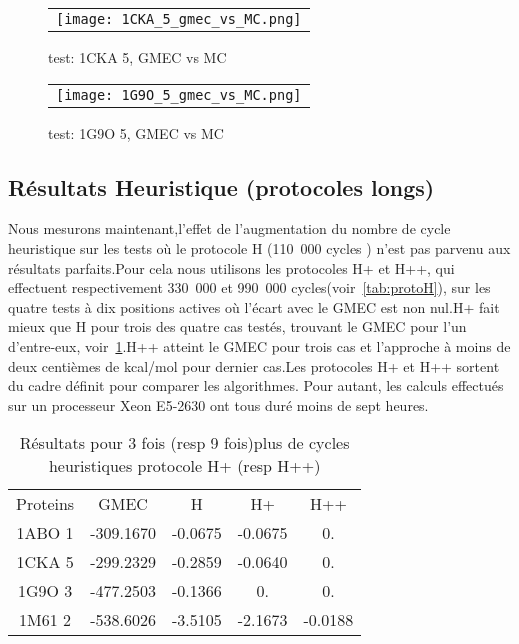     \begin{figure}[h]
      \centering
      \begin{tabular}{c} 
        \texttt{[image: 1CKA\_5\_gmec\_vs\_MC.png]} 
      \end{tabular}
      
      \caption{test: 1CKA 5, GMEC vs MC}
\label{image:1CKA_5_GMEC_vs_MC}
    \end{figure}
    

    \begin{figure}[h]
      \centering
      \begin{tabular}{c} 
        \texttt{[image: 1G9O\_5\_gmec\_vs\_MC.png]} 
      \end{tabular}
      
      \caption{test: 1G9O 5, GMEC vs MC}
\label{image:1G9O_5_GMEC_vs_MC}
    \end{figure}
    
    \clearpage

   \subsection{Résultats Heuristique (protocoles longs)}

Nous mesurons maintenant,l'effet de l'augmentation du nombre de cycle heuristique sur les tests où le protocole H (110~000 cycles ) n'est pas parvenu aux résultats parfaits.Pour cela nous utilisons les protocoles H+ et H++, qui effectuent respectivement 330~000 et 990~000 cycles(voir~\ref{tab:protoH}), sur les quatre tests à dix positions actives où l'écart avec le GMEC est non nul.H+ fait mieux que H pour trois des quatre cas testés, trouvant le GMEC pour l'un d'entre-eux, voir~\ref{tab:H+_H++}.H++ atteint le GMEC pour trois cas et l'approche à moins de deux centièmes de kcal/mol pour dernier cas.Les protocoles H+ et H++ sortent du cadre définit pour comparer les algorithmes. Pour autant, les calculs effectués sur un processeur Xeon E5-2630  ont tous duré moins de sept heures.  

    \begin{table}[h]
      \centering

      \begin{tabular}{ccccc}

        \toprule
        Proteins & GMEC & H & H+ & H++ \\
        \cmidrule{1-5}
        1ABO 1 & -309.1670 & -0.0675 & -0.0675 & 0. \\
        1CKA 5 & -299.2329 & -0.2859 & -0.0640 & 0. \\
        1G9O 3 & -477.2503 & -0.1366 & 0. & 0. \\
        1M61 2 & -538.6026 & -3.5105 & -2.1673 & -0.0188 \\
        \toprule


 \end{tabular}      
 \caption{Résultats pour 3 fois (resp 9 fois)plus de cycles heuristiques protocole H+ (resp H++)}
\label{tab:H+_H++}       
\end{table}


